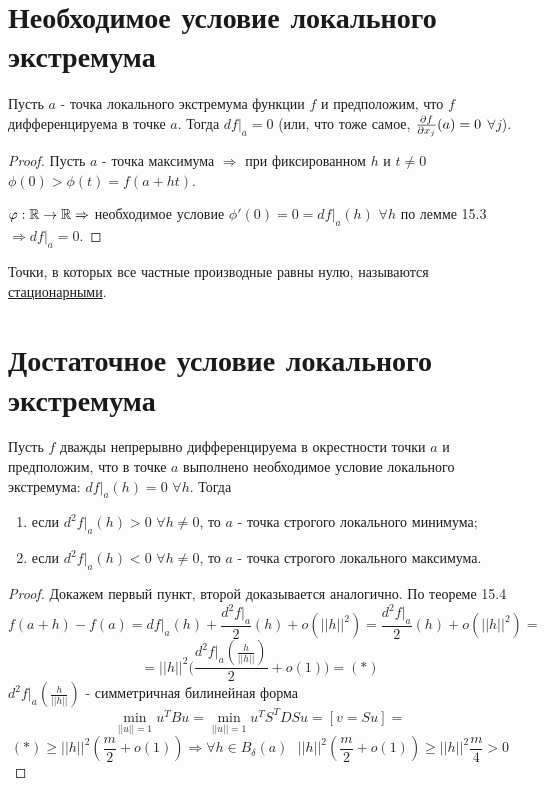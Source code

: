     \section{Необходимое условие локального экстремума}
    \begin{theorem}
    	Пусть $a$ - точка локального экстремума функции $f$ и предположим, что $f$ дифференцируема в точке $a$. Тогда $df|_a = 0$ (или, что тоже самое, $\frac{\partial f}{\partial x_j}(a) = 0$ $\forall j$).
    \end{theorem}
    
    \begin{proof}
    	Пусть $a$ - точка максимума $\Rightarrow$ при фиксированном $h$ и $t \neq 0$ $\phi(0) > \phi(t) = f(a + ht)$.
    	
    	$\varphi: \mathbb R \rightarrow \mathbb R \Rightarrow$ необходимое условие $\phi'(0) = 0 = df|_a(h)$ $\forall h$ по лемме 15.3 $\Rightarrow df|_a = 0$.
    \end{proof}
    
    \begin{definition}
    	Точки, в которых все частные производные равны нулю, называются \underline{стационарными}.
    \end{definition}
    
    \section{Достаточное условие локального экстремума}
    
    \begin{theorem}
    	Пусть $f$ дважды непрерывно дифференцируема в окрестности точки $a$ и предположим, что в точке $a$ выполнено необходимое условие локального экстремума: $df|_a(h) = 0$ $\forall h$. Тогда
    	\begin{enumerate}
    		\item если $d^2f|_a(h) > 0$ $\forall h \neq 0$, то $a$ - точка строгого локального минимума;
    		\item если $d^2f|_a(h) < 0$ $\forall h \neq 0$, то $a$ - точка строгого локального максимума.
    	\end{enumerate}
    \end{theorem}
    
    \begin{proof}
    	Докажем первый пункт, второй доказывается аналогично. По теореме 15.4
    	\[ f(a + h) - f(a) = df|_a(h) + \frac{d^2f|_a}{2}(h) + o(||h||^2) = \frac{d^2f|_a}{2}(h) + o(||h||^2) = \]
    	\[ = ||h||^2 \bigg(\frac{d^2f|_a(\frac{h}{||h||})}{2} + o(1)\bigg) = (*) \]
    	$d^2f|_a(\frac{h}{||h||})$ - симметричная билинейная форма
    	\[ \min_{||u|| = 1} u^T B u = \min_{||u|| = 1} u^T S^T D S u = [v = Su] =  \]
    	\[ (*) \geqslant ||h||^2 (\frac{m}{2} + o(1)) \Rightarrow \forall h \in B_{\delta}(a) \text{ } ||h||^2 (\frac{m}{2} + o(1)) \geqslant ||h||^2 \frac{m}{4} > 0 \]
    \end{proof}
    
